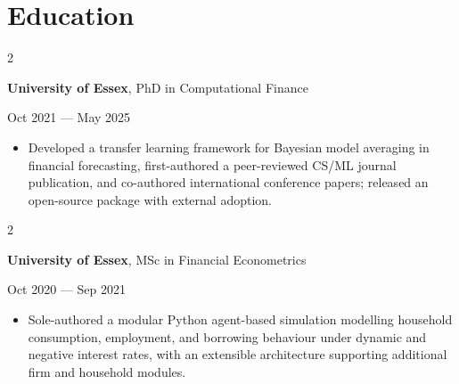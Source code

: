 \documentclass[6pt, letterpaper]{article}
\newenvironment{highlights}{
    \begin{itemize}[
        topsep=0.03 cm,
        parsep=0.03 cm,
        partopsep=0pt,
        itemsep=0pt,
        leftmargin=0 cm + 10pt
    ]
}{
    \end{itemize}
} %
\newenvironment{twocolentry}[2][]{
    \onecolentry
    \def\secondColumn{#2}
    \setcolumnwidth{\fill, 4.5 cm}
    \begin{paracol}{2}
}{
    \switchcolumn \raggedleft \secondColumn
    \end{paracol}
    \endonecolentry
} %
\begin{document}
    \section{Education}

            \begin{twocolentry}{
                Oct 2021 --- May 2025
            }
            \textbf{University of Essex}, PhD in Computational Finance
            \end{twocolentry}

            \begin{highlights}

            \item Developed a transfer learning framework for Bayesian model averaging in financial forecasting, first-authored a peer-reviewed CS/ML journal publication, and co-authored international conference papers; released an open-source package with external adoption.

            \end{highlights}

            \begin{twocolentry}{
                Oct 2020 --- Sep 2021
            }
            \textbf{University of Essex}, MSc in Financial Econometrics
            \end{twocolentry}

            \begin{highlights}

            \item Sole-authored a modular Python agent-based simulation modelling household consumption, employment, and borrowing behaviour under dynamic and negative interest rates, with an extensible architecture supporting additional firm and household modules.

            \end{highlights}
\end{document}
